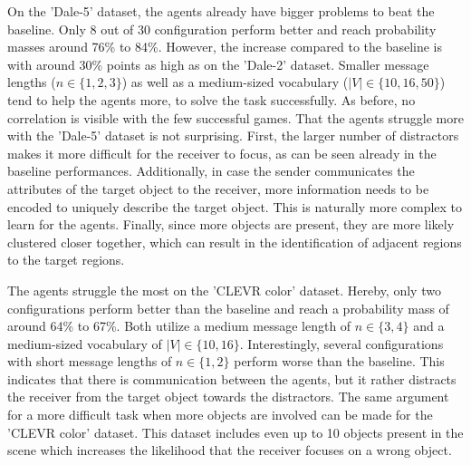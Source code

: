 On the 'Dale-5' dataset, the agents already have bigger problems to beat the baseline.
Only 8 out of 30 configuration perform better and reach probability masses around 76\% to 84\%.
However, the increase compared to the baseline is with around 30\% points as high as on the 'Dale-2' dataset.
Smaller message lengths ($n \in \{1,2,3\}$) as well as a medium-sized vocabulary ($|V| \in \{10,16,50\}$) tend to help the agents more, to solve the task successfully.
As before, no correlation is visible with the few successful games.
That the agents struggle more with the 'Dale-5' dataset is not surprising.
First, the larger number of distractors makes it more difficult for the receiver to focus, as can be seen already in the baseline performances.
Additionally, in case the sender communicates the attributes of the target object to the receiver, more information needs to be encoded to uniquely describe the target object.
This is naturally more complex to learn for the agents.
Finally, since more objects are present, they are more likely clustered closer together, which can result in the identification of adjacent regions to the target regions.

The agents struggle the most on the 'CLEVR color' dataset.
Hereby, only two configurations perform better than the baseline and reach a probability mass of around 64\% to 67\%.
Both utilize a medium message length of $n \in \{3,4\}$ and a medium-sized vocabulary of $|V| \in \{10,16\}$.
Interestingly, several configurations with short message lengths of $n \in \{1,2\}$ perform worse than the baseline.
This indicates that there is communication between the agents, but it rather distracts the receiver from the target object towards the distractors.
The same argument for a more difficult task when more objects are involved can be made for the 'CLEVR color' dataset.
This dataset includes even up to 10 objects present in the scene which increases the likelihood that the receiver focuses on a wrong object.

